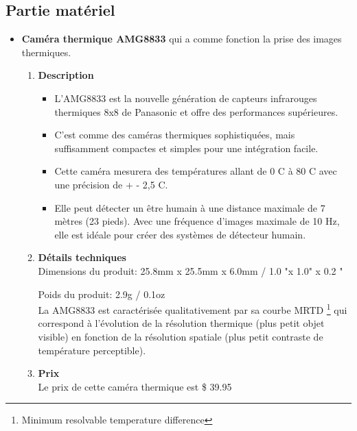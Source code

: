 \documentclass[12pt]{article}
\begin{document}
\subsection{Partie matériel}
\begin{itemize}
	\item \textbf{Caméra thermique AMG8833} \cite{45} qui a comme fonction la prise des images thermiques.
	\begin{enumerate}
	\item \textbf{Description}\\
	\begin{itemize}
	\item L'AMG8833 est la nouvelle génération de capteurs infrarouges thermiques 8x8 de Panasonic et offre des performances supérieures.
	\item C'est comme des caméras thermiques sophistiquées, mais suffisamment compactes et simples pour une intégration facile.
	\item Cette caméra mesurera des températures allant de 0 C\textdegree{} à 80 C\textdegree{} avec une précision de + - 2,5 C\textdegree{}. 
	\item Elle peut détecter un être humain à une distance maximale de 7 mètres (23 pieds). Avec une fréquence d'images maximale de 10 Hz, elle est idéale pour créer des systèmes de détecteur humain.

	\end{itemize}

	\item \textbf{Détails techniques}\\
	Dimensions du produit: 25.8mm x 25.5mm x 6.0mm / 1.0 "x 1.0" x 0.2 "
	
	Poids du produit: 2.9g / 0.1oz\\
	La AMG8833 est caractérisée qualitativement par sa courbe MRTD \footnote{Minimum resolvable temperature difference} qui correspond à l’évolution de la résolution thermique (plus petit objet visible) en fonction de la résolution spatiale (plus petit contraste de température perceptible).
	\item \textbf{Prix}\\
	Le prix de cette caméra thermique est  \$ 39.95  
\end{enumerate}	 


\end{itemize}
\end{document}
